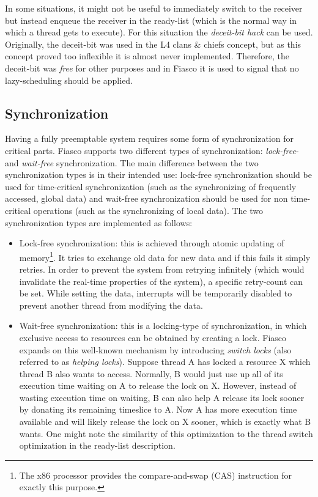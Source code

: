 In some situations, it might not be useful to immediately switch to the receiver but instead enqueue the receiver in the ready-list (which is the normal way in which a thread gets to execute). For this situation the \emph{deceit-bit hack} can be used. Originally, the deceit-bit was used in the L4 clans \& chiefs concept, but as this concept proved too inflexible it is almost never implemented. Therefore, the deceit-bit was \textit{free} for other purposes and in Fiasco it is used to signal that no lazy-scheduling should be applied.

\subsection{Synchronization}
Having a fully preemptable system requires some form of synchronization for critical parts. Fiasco supports two different types of synchronization: \emph{lock-free}- and \emph{wait-free} synchronization. The main difference between the two synchronization types is in their intended use: lock-free synchronization should be used for time-critical synchronization (such as the synchronizing of frequently accessed, global data) and wait-free synchronization should be used for non time-critical operations (such as the synchronizing of local data). The two synchronization types are implemented as follows:

\begin{itemize}
	\item Lock-free synchronization: this is achieved through atomic updating of memory\footnote{The x86 processor provides the compare-and-swap (CAS) instruction for exactly this purpose.}. It tries to exchange old data for new data and if this fails it simply retries. In order to prevent the system from retrying infinitely (which would invalidate the real-time properties of the system), a specific retry-count can be set. While setting the data, interrupts will be temporarily disabled to prevent another thread from modifying the data.
	\item Wait-free synchronization: this is a locking-type of synchronization, in which exclusive access to resources can be obtained by creating a lock. Fiasco expands on this well-known mechanism by introducing \emph{switch locks} (also referred to as \emph{helping locks}). Suppose thread A has locked a resource X which thread B also wants to access. Normally, B would just use up all of its execution time waiting on A to release the lock on X. However, instead of wasting execution time on waiting, B can also help A release its lock sooner by donating its remaining timeslice to A. Now A has more execution time available and will likely release the lock on X sooner, which is exactly what B wants. One might note the similarity of this optimization to the thread switch optimization in the ready-list description.
\end{itemize}

